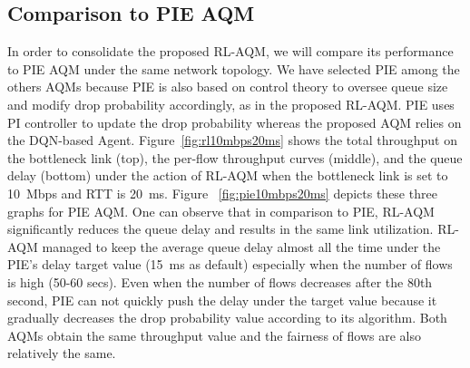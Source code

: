 \documentclass[conference]{IEEEtran}
\begin{document}
\subsection{Comparison to PIE AQM}
In order to consolidate the proposed RL-AQM, we will compare its performance to PIE AQM \cite{pan2017proportional} under the same network topology. We have selected PIE among the others AQMs because PIE is also based on control theory to oversee queue size and modify drop  probability accordingly, as in the proposed RL-AQM. PIE uses PI controller to update the drop probability whereas the proposed AQM relies on the DQN-based Agent. Figure~\ref{fig:rl10mbps20ms} shows the total throughput on the bottleneck link (top), the per-flow throughput curves (middle), and the queue delay (bottom) under the action of RL-AQM when the bottleneck link is set to 10~Mbps and RTT is 20~ms. Figure~ \ref{fig:pie10mbps20ms} depicts these three graphs for PIE AQM. One can observe that in comparison to PIE, RL-AQM significantly reduces the queue delay and results in the same link utilization. RL-AQM managed to keep the average queue delay almost all the time under the PIE's delay target value (15~ms as default) especially when the number of flows is high (50-60 secs). Even when the number of flows decreases after the 80th second, PIE can not quickly push the delay under the target value because it gradually decreases the drop probability value according to its algorithm. Both AQMs obtain the same throughput value and the fairness of flows are also relatively the same.  
\end{document}
